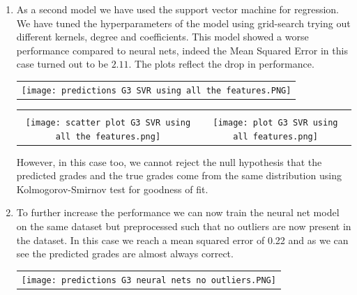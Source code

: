 \documentclass[a4paper, 11pt]{report}
\theoremstyle{definition}
\numberwithin{equation}{section}		%
\numberwithin{figure}{section}			%
\numberwithin{table}{section}				%
\begin{document}
\begin{enumerate}
\item As a second model we have used the support vector machine for regression. We have tuned the hyperparameters of the model using grid-search trying out different kernels, degree and coefficients. This model showed a worse performance compared to neural nets, indeed the Mean Squared Error in this case turned out to be $2.11$. The plots reflect the drop in performance.
\newline
    \begin{frame}
      \centering
        \begin{tabular}{c}
         \\
        \texttt{[image: predictions G3 SVR using all the features.PNG]}
      \end{tabular}

      \vspace{0.05em}
        \begin{tabular}{cc}
          &  \\
        \texttt{[image: scatter plot G3 SVR using all the features.png]}
         &
         \texttt{[image: plot G3 SVR using all features.png]}
         \end{tabular}
    \end{frame}
\newline
However, in this case too, we cannot reject the null hypothesis that the predicted grades and the true grades come from the same distribution using Kolmogorov-Smirnov test for goodness of fit.
\newline
\item To further increase the performance we can now train the neural net model on the same dataset but preprocessed such that no outliers are now present in the dataset. In this case we reach a mean squared error of 0.22 and as we can see the predicted grades are almost always correct.
\newline
    \begin{frame}
      \centering
        \begin{tabular}{c}
         \\
        \texttt{[image: predictions G3 neural nets no outliers.PNG]}
      \end{tabular}


\end{frame}
\end{enumerate}
\end{document}
